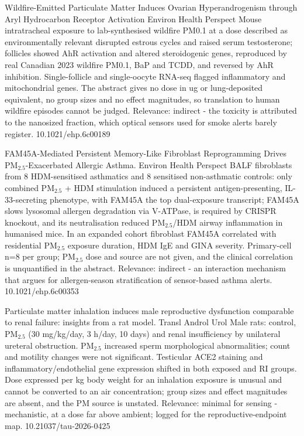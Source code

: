 \documentclass[10pt]{article}
\begin{document}
\par{}\baselineskip{}\baselineskip
{}

{Wildfire-Emitted Particulate Matter Induces Ovarian Hyperandrogenism through Aryl Hydrocarbon Receptor Activation}
{Environ Health Perspect}
{Mouse intratracheal exposure to lab-synthesised wildfire PM0.1 at a dose described as environmentally relevant disrupted estrous cycles and raised serum testosterone; follicles showed AhR activation and altered steroidogenic genes, reproduced by real Canadian 2023 wildfire PM0.1, BaP and TCDD, and reversed by AhR inhibition. Single-follicle and single-oocyte RNA-seq flagged inflammatory and mitochondrial genes. The abstract gives no dose in ug or lung-deposited equivalent, no group sizes and no effect magnitudes, so translation to human wildfire episodes cannot be judged. Relevance: indirect - the toxicity is attributed to the nanosized fraction, which optical sensors used for smoke alerts barely register.}
{10.1021/ehp.6c00189}

{FAM45A-Mediated Persistent Memory-Like Fibroblast Reprogramming Drives PM$_{2.5}$-Exacerbated Allergic Asthma.}
{Environ Health Perspect}
{BALF fibroblasts from 8 HDM-sensitised asthmatics and 8 sensitised non-asthmatic controls: only combined PM$_{2.5}$ + HDM stimulation induced a persistent antigen-presenting, IL-33-secreting phenotype, with FAM45A the top dual-exposure transcript; FAM45A slows lysosomal allergen degradation via V-ATPase, is required by CRISPR knockout, and its neutralisation reduced PM$_{2.5}$/HDM airway inflammation in humanised mice. In an expanded cohort fibroblast FAM45A correlated with residential PM$_{2.5}$ exposure duration, HDM IgE and GINA severity. Primary-cell n=8 per group; PM$_{2.5}$ dose and source are not given, and the clinical correlation is unquantified in the abstract. Relevance: indirect - an interaction mechanism that argues for allergen-season stratification of sensor-based asthma alerts.}
{10.1021/ehp.6c00353}

{Particulate matter inhalation induces male reproductive dysfunction comparable to renal failure: insights from a rat model.}
{Transl Androl Urol}
{Male rats: control, PM$_{2.5}$ (30 mg/kg/day, 3 h/day, 10 days) and renal insufficiency by unilateral ureteral obstruction. PM$_{2.5}$ increased sperm morphological abnormalities; count and motility changes were not significant. Testicular ACE2 staining and inflammatory/endothelial gene expression shifted in both exposed and RI groups. Dose expressed per kg body weight for an inhalation exposure is unusual and cannot be converted to an air concentration; group sizes and effect magnitudes are absent, and the PM source is unstated. Relevance: minimal for sensing - mechanistic, at a dose far above ambient; logged for the reproductive-endpoint map.}
{10.21037/tau-2026-0425}
\end{document}
